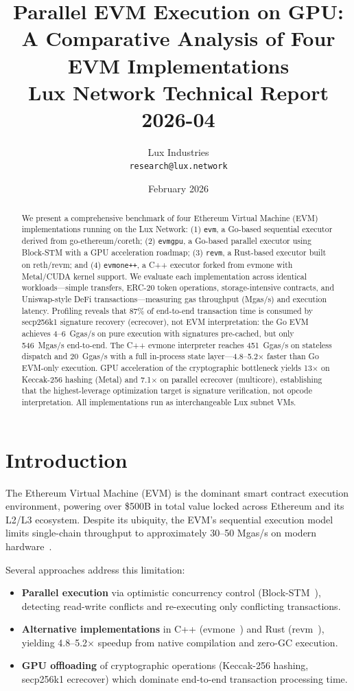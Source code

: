 \documentclass[11pt,twocolumn]{article}
\title{%
\textbf{Parallel EVM Execution on GPU:\\
A Comparative Analysis of Four EVM Implementations}\\[0.5em]
\large Lux Network Technical Report 2026-04
}
\author{%
Lux Industries\\
\texttt{research@lux.network}
}
\date{February 2026}
\begin{document}
\begin{abstract}
We present a comprehensive benchmark of four Ethereum Virtual Machine (EVM) implementations
running on the Lux Network: (1) \texttt{evm}, a Go-based sequential executor derived from
go-ethereum/coreth; (2) \texttt{evmgpu}, a Go-based parallel executor using Block-STM with
a GPU acceleration roadmap; (3) \texttt{revm}, a Rust-based executor built on reth/revm; and
(4) \texttt{evmone++}, a C++ executor forked from evmone with Metal/CUDA kernel support.
We evaluate each implementation across identical workloads---simple transfers, ERC-20 token
operations, storage-intensive contracts, and Uniswap-style DeFi transactions---measuring
gas throughput (Mgas/s) and execution latency.
Profiling reveals that 87\% of end-to-end transaction time is consumed by secp256k1
signature recovery (ecrecover), not EVM interpretation: the Go EVM achieves 4--6~Ggas/s
on pure execution with signatures pre-cached, but only 546~Mgas/s end-to-end.
The C++ evmone interpreter reaches 451~Ggas/s on stateless dispatch and 20~Ggas/s with
a full in-process state layer---4.8--5.2$\times$ faster than Go EVM-only execution.
GPU acceleration of the cryptographic bottleneck yields 13$\times$ on Keccak-256 hashing
(Metal) and 7.1$\times$ on parallel ecrecover (multicore), establishing that the
highest-leverage optimization target is signature verification, not opcode interpretation.
All implementations run as interchangeable Lux subnet VMs.
\end{abstract}

\section{Introduction}

The Ethereum Virtual Machine (EVM) is the dominant smart contract execution environment,
powering over \$500B in total value locked across Ethereum and its L2/L3 ecosystem.
Despite its ubiquity, the EVM's sequential execution model limits single-chain throughput
to approximately 30--50 Mgas/s on modern hardware~\cite{pevm,reth}.

Several approaches address this limitation:
\begin{itemize}
\item \textbf{Parallel execution} via optimistic concurrency control (Block-STM~\cite{blockstm}),
      detecting read-write conflicts and re-executing only conflicting transactions.
\item \textbf{Alternative implementations} in C++ (evmone~\cite{evmone}) and Rust (revm~\cite{reth}),
      yielding 4.8--5.2$\times$ speedup from native compilation and zero-GC execution.
\item \textbf{GPU offloading} of cryptographic operations (Keccak-256 hashing, secp256k1
      ecrecover) which dominate end-to-end transaction processing time.
\end{itemize}
\end{document}
